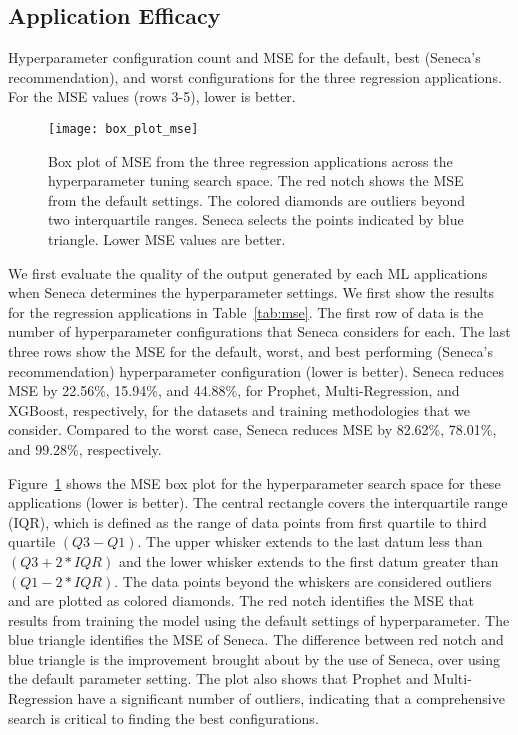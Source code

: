 \subsection{Application Efficacy}

\begin{table}
\centering

\caption{Hyperparameter configuration count and MSE for the default, 
best (Seneca's recommendation), and worst configurations for the three regression applications. 
For the MSE  values (rows 3-5), lower is better.
\label{tab:mse}}
\vspace{-0.2in}
\end{table}

\begin{figure}[t] \centering 
\vspace{-0.5in}
\texttt{[image: box\_plot\_mse]}
\vspace{-0.4in}
\caption{Box plot of MSE from the three regression applications across the 
hyperparameter tuning search space. The red notch shows the MSE from the default settings. 
The colored diamonds are outliers beyond two interquartile ranges. 
Seneca selects the points indicated by blue triangle.
Lower MSE values are better. 
\label{fig:box_plot_mse}}
\vspace{-0.1in}
\end{figure}

We first evaluate the quality of the output generated by each
ML applications when Seneca determines the hyperparameter settings. We
first show the results for the regression applications in
Table~\ref{tab:mse}.
The first row of data is the number of hyperparameter 
configurations that Seneca considers for each.
The last three rows show the MSE for the default, worst, and best performing (Seneca's recommendation)
hyperparameter configuration (lower is better).
Seneca reduces MSE by 22.56\%, 15.94\%, and 44.88\%, for Prophet, Multi-Regression, and XGBoost,
respectively, for the datasets and training methodologies that we consider.
Compared to the worst case, Seneca reduces MSE by 82.62\%, 78.01\%, and 99.28\%, respectively.

Figure~\ref{fig:box_plot_mse} shows the MSE box plot for the hyperparameter search space for these applications (lower is better). 
The central rectangle covers the interquartile range (IQR),
which is defined as the range of data
points from first quartile to third quartile \texttt{$(Q3 - Q1)$}.
The upper whisker extends to the last datum less
than \texttt{$(Q3 + 2 * IQR)$} and the lower whisker extends to the first datum greater
than \texttt{$(Q1 - 2 * IQR)$}. The data points beyond the whiskers are considered outliers
and are plotted as colored diamonds. The red notch identifies the MSE that results from training
the model using the default settings of hyperparameter.
The blue triangle identifies the MSE of Seneca.
The difference between red notch and blue triangle
is the improvement brought about by the use of Seneca, over 
using the default parameter setting.
The plot also shows
that Prophet and Multi-Regression have a significant number of outliers,
indicating that a comprehensive search is critical to finding the best configurations.


